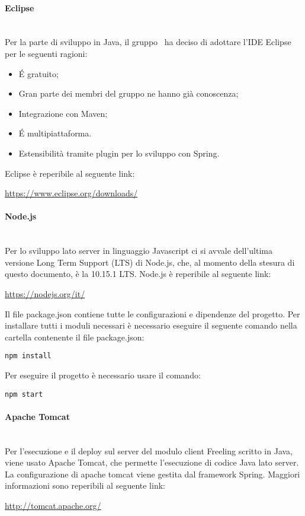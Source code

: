 \paragraph{Eclipse}\mbox{}\\
Per la parte di sviluppo in Java, il gruppo \gruppo \ ha deciso di adottare l'IDE Eclipse per le seguenti ragioni:
\begin{itemize}
	\item \'E gratuito;
	\item Gran parte dei membri del gruppo ne hanno già conoscenza;
	\item Integrazione con Maven;
	\item \'E multipiattaforma.
	\item Estensibilità tramite plugin per lo sviluppo con Spring.
\end{itemize}
Eclipse è reperibile al seguente link:\newline
\begin{center}
	\url{https://www.eclipse.org/downloads/}
\end{center}

\paragraph{Node.js}\mbox{}\\
Per lo sviluppo lato server in linguaggio Javascript ci si avvale dell'ultima versione Long Term Support (LTS) di Node.js, che, al momento della stesura di questo documento, è la 10.15.1 LTS.
Node.js è reperibile al seguente link:
\begin{center}
	\url{https://nodejs.org/it/}
\end{center} 
Il file package.json contiene tutte le configurazioni e dipendenze del progetto. Per installare tutti i moduli necessari è necessario eseguire il seguente comando nella cartella contenente il file package.json:
\begin{center}
	\texttt{npm install}
\end{center}
Per eseguire il progetto è necessario usare il comando:
\begin{center}
	\texttt{npm start}
\end{center}

\paragraph{Apache Tomcat}\mbox{}\\
Per l'esecuzione e il deploy sul server del modulo client Freeling scritto in Java, viene usato Apache Tomcat, che permette l'esecuzione di codice Java lato server. La configurazione di apache tomcat viene gestita dal framework Spring.
Maggiori informazioni sono reperibili al seguente link:\newline
\begin{center}
	\url{http://tomcat.apache.org/}
\end{center}


